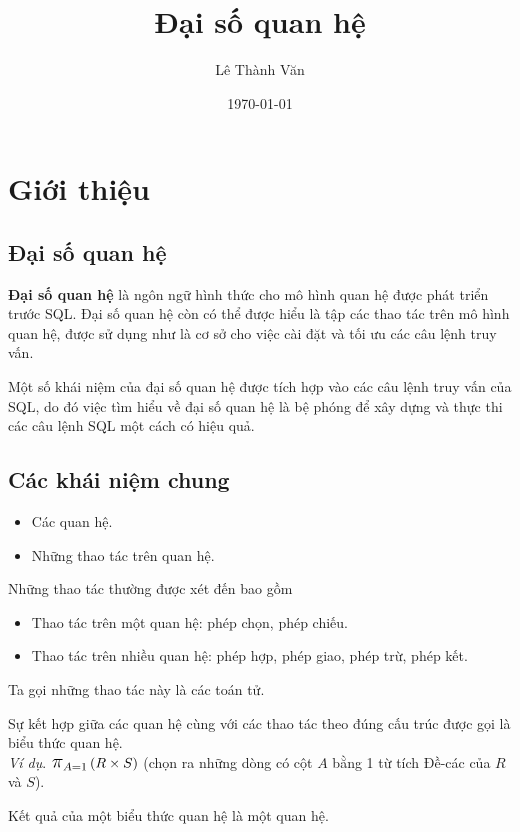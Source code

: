 \documentclass[11pt, handout]{beamer}
\title{Đại số quan hệ}
\institute{Khoa Hệ thống thông tin quản lý}
\author{Lê Thành Văn}
\date{\today}
\newcommand{\mmm}[1]{\mathlarger{\mathlarger{\mathlarger#1}}}%
\newcommand{\ppi}[2]{\mmm{\pi}_{#1}\left(#2\right)}%
\begin{document}
  \begin{frame}
    \titlepage
  \end{frame}
  \section{Giới thiệu}
  \subsection{Đại số quan hệ}
  \begin{frame}
    \textbf{Đại số quan hệ} là ngôn ngữ hình thức cho mô hình quan hệ được phát triển trước SQL. 
    Đại số quan hệ còn có thể được hiểu là tập các thao tác trên mô hình quan hệ, được sử dụng như là cơ sở cho việc cài đặt và tối ưu các câu lệnh truy vấn.
  \end{frame}
  \begin{frame}
    Một số khái niệm của đại số quan hệ được tích hợp vào các câu lệnh truy vấn của SQL, 
    do đó việc tìm hiểu về đại số quan hệ là bệ phóng để xây dựng và thực thi các câu lệnh SQL một cách có hiệu quả.
  \end{frame}
  \subsection{Các khái niệm chung}
  \begin{frame}
    \begin{itemize}
      \item<2-> Các quan hệ.
      \item<3-> Những thao tác trên quan hệ.
    \end{itemize}  
  \end{frame}
  \begin{frame}
    Những thao tác thường được xét đến bao gồm
    \begin{itemize}
      \item Thao tác trên một quan hệ: phép chọn, phép chiếu.
      \item Thao tác trên nhiều quan hệ: phép hợp, phép giao, phép trừ, phép kết.
    \end{itemize}
    Ta gọi những thao tác này là các toán tử.
  \end{frame}
  \begin{frame}
    Sự kết hợp giữa các quan hệ cùng với các thao tác theo đúng cấu trúc được gọi là biểu thức quan hệ. \\
    \textit{Ví dụ}. $\ppi{A = 1}{R \times S}$ (chọn ra những dòng có cột $A$ bằng 1 từ 
    tích Đề-các của $R$ và $S$).
  \end{frame}
  \begin{frame}
    Kết quả của một biểu thức quan hệ là một quan hệ.
  \end{frame}
\end{document}
